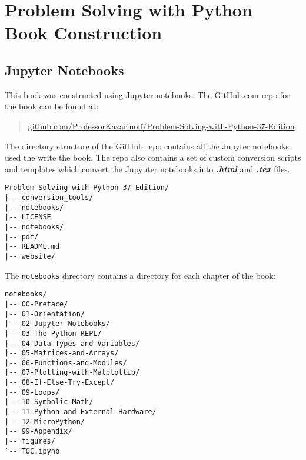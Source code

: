 \documentclass{book}
\newcommand{\passthrough}[1]{#1}
\begin{document}
    
        \hypertarget{problem-solving-with-python-book-construction}{%
\section{Problem Solving with Python Book
Construction}\label{problem-solving-with-python-book-construction}}
    




    
        \hypertarget{jupyter-notebooks}{%
\subsection{Jupyter Notebooks}\label{jupyter-notebooks}}
    




    
        This book was constructed using Jupyter notebooks. The GitHub.com repo
for the book can be found at:

\begin{quote}
\href{https://github.com/ProfessorKazarinoff/Problem-Solving-with-Python-37-Edition}{github.com/ProfessorKazarinoff/Problem-Solving-with-Python-37-Edition}
\end{quote}
    




    
        The directory structure of the GitHub repo contains all the Jupyter
notebooks used the write the book. The repo also contains a set of
custom conversion scripts and templates which convert the Jupyuter
notebooks into \textbf{\emph{.html}} and \textbf{\emph{.tex}} files.
    




    
        \begin{lstlisting}
Problem-Solving-with-Python-37-Edition/
|-- conversion_tools/
|-- notebooks/
|-- LICENSE
|-- notebooks/
|-- pdf/
|-- README.md
|-- website/
\end{lstlisting}
    




    
        The \passthrough{\lstinline!notebooks!} directory contains a directory
for each chapter of the book:
    




    
        \begin{lstlisting}
notebooks/
|-- 00-Preface/
|-- 01-Orientation/
|-- 02-Jupyter-Notebooks/
|-- 03-The-Python-REPL/
|-- 04-Data-Types-and-Variables/
|-- 05-Matrices-and-Arrays/
|-- 06-Functions-and-Modules/
|-- 07-Plotting-with-Matplotlib/
|-- 08-If-Else-Try-Except/
|-- 09-Loops/
|-- 10-Symbolic-Math/
|-- 11-Python-and-External-Hardware/
|-- 12-MicroPython/
|-- 99-Appendix/
|-- figures/
`-- TOC.ipynb
\end{lstlisting}
\end{document}
